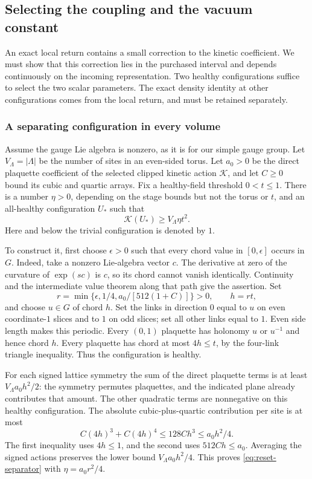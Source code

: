 \subsection{Selecting the coupling and the vacuum constant}
\label{sec:coupling-reset-selection}
An exact local return contains a small correction to the kinetic
coefficient. We must show that this correction lies in the purchased
interval and depends continuously on the incoming representation. Two
healthy configurations suffice to select the two scalar parameters. The
exact density identity at other configurations comes from the local
return, and must be retained separately.

\subsubsection{A separating configuration in every volume}
Assume the gauge Lie algebra is nonzero, as it is for our simple gauge group.
Let $V_\Lambda=|\Lambda|$ be the number of sites in an even-sided torus.
Let $a_0>0$ be the direct plaquette coefficient of the selected clipped
kinetic action $\mathcal K$, and let $C\ge0$ bound its cubic and quartic
arrays. Fix a healthy-field threshold $0<t\le1$. There is a number
$\eta>0$, depending on the stage bounds but not the torus or $t$, and
an all-healthy configuration $U_*$ such that
\begin{equation}\label{eq:reset-separator}
                  \mathcal K(U_*)\ge V_\Lambda\eta t^2.
\end{equation}
Here and below the trivial configuration is denoted by $1$.

To construct it, first choose $\epsilon>0$ such that every chord value
in $[0,\epsilon]$ occurs in $G$. Indeed, take a nonzero Lie-algebra
vector $c$. The derivative at zero of the curvature of $\exp(sc)$ is
$c$, so its chord cannot vanish identically. Continuity and the
intermediate value theorem along that path give the assertion. Set
\[
 r=\min\{\epsilon,1/4,a_0/[512(1+C)]\}>0,
 \qquad h=rt,
\]
and choose $u\in G$ of chord $h$. Set the links in direction $0$ equal
to $u$ on even coordinate-$1$ slices and to $1$ on odd slices; set all
other links equal to $1$. Even side length makes this periodic. Every
$(0,1)$ plaquette has holonomy $u$ or $u^{-1}$ and hence chord $h$.
Every plaquette has chord at most $4h\le t$, by the four-link triangle
inequality. Thus the configuration is healthy.

For each signed lattice symmetry the sum of the direct plaquette terms
is at least $V_\Lambda a_0h^2/2$: the symmetry permutes plaquettes,
and the indicated plane already contributes that amount. The other
quadratic terms are nonnegative on this healthy configuration. The
absolute cubic-plus-quartic contribution per site is at most
\[
 C(4h)^3+C(4h)^4
 \le 128Ch^3\le a_0h^2/4.
\]
The first inequality uses $4h\le1$, and the second uses
$512Ch\le a_0$. Averaging the signed actions preserves the lower
bound $V_\Lambda a_0h^2/4$. This proves
\eqref{eq:reset-separator} with $\eta=a_0r^2/4$.

